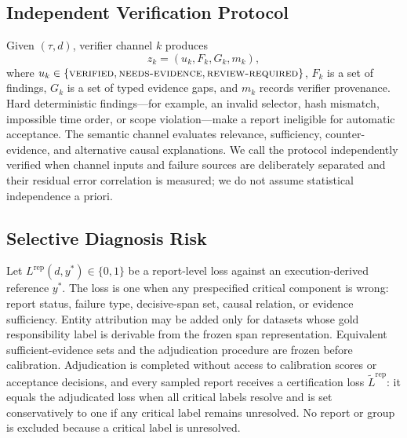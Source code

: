 \subsection{Independent Verification Protocol}

Given $(\tau,d)$, verifier channel $k$ produces
\begin{equation}
    z_k=(u_k,F_k,G_k,m_k),
\end{equation}
where $u_k\in\{\textsc{verified},\textsc{needs-evidence},
\textsc{review-required}\}$, $F_k$ is a set of findings, $G_k$ is a set of
typed evidence gaps, and $m_k$ records verifier provenance. Hard deterministic
findings---for example, an invalid selector, hash mismatch, impossible time
order, or scope violation---make a report ineligible for automatic acceptance.
The semantic channel evaluates relevance, sufficiency, counter-evidence, and
alternative causal explanations. We call the protocol independently verified
when channel inputs and failure sources are deliberately separated and their
residual error correlation is measured; we do not assume statistical
independence a priori.

\subsection{Selective Diagnosis Risk}

Let $L^{\mathrm{rep}}(d,y^*)\in\{0,1\}$ be a report-level loss against an
execution-derived reference $y^*$. The loss is one when any prespecified
critical component is wrong: report status, failure type, decisive-span set,
causal relation, or evidence sufficiency. Entity attribution may be added only
for datasets whose gold responsibility label is derivable from the frozen span
representation. Equivalent sufficient-evidence sets and the adjudication
procedure are frozen before calibration. Adjudication is completed without
access to calibration scores or acceptance decisions, and every sampled report
receives a certification loss $\widetilde L^{\mathrm{rep}}$: it equals the
adjudicated loss when all critical labels resolve and is set conservatively to
one if any critical label remains unresolved. No report or group is excluded
because a critical label is unresolved.

